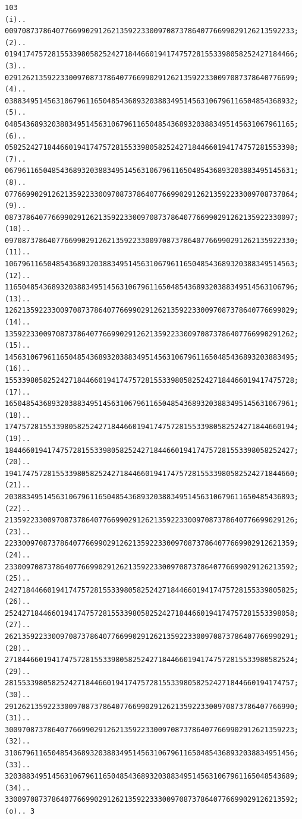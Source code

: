 \documentclass[10pt,a4paper]{article}
\begin{document}
\begin{verbatim}
103
(i).. 00970873786407766990291262135922330097087378640776699029126213592233;
(2).. 01941747572815533980582524271844660194174757281553398058252427184466;
(3).. 02912621359223300970873786407766990291262135922330097087378640776699;
(4).. 03883495145631067961165048543689320388349514563106796116504854368932;
(5).. 04854368932038834951456310679611650485436893203883495145631067961165;
(6).. 05825242718446601941747572815533980582524271844660194174757281553398;
(7).. 06796116504854368932038834951456310679611650485436893203883495145631;
(8).. 07766990291262135922330097087378640776699029126213592233009708737864;
(9).. 08737864077669902912621359223300970873786407766990291262135922330097;
(10).. 09708737864077669902912621359223300970873786407766990291262135922330;
(11).. 10679611650485436893203883495145631067961165048543689320388349514563;
(12).. 11650485436893203883495145631067961165048543689320388349514563106796;
(13).. 12621359223300970873786407766990291262135922330097087378640776699029;
(14).. 13592233009708737864077669902912621359223300970873786407766990291262;
(15).. 14563106796116504854368932038834951456310679611650485436893203883495;
(16).. 15533980582524271844660194174757281553398058252427184466019417475728;
(17).. 16504854368932038834951456310679611650485436893203883495145631067961;
(18).. 17475728155339805825242718446601941747572815533980582524271844660194;
(19).. 18446601941747572815533980582524271844660194174757281553398058252427;
(20).. 19417475728155339805825242718446601941747572815533980582524271844660;
(21).. 20388349514563106796116504854368932038834951456310679611650485436893;
(22).. 21359223300970873786407766990291262135922330097087378640776699029126;
(23).. 22330097087378640776699029126213592233009708737864077669902912621359;
(24).. 23300970873786407766990291262135922330097087378640776699029126213592;
(25).. 24271844660194174757281553398058252427184466019417475728155339805825;
(26).. 25242718446601941747572815533980582524271844660194174757281553398058;
(27).. 26213592233009708737864077669902912621359223300970873786407766990291;
(28).. 27184466019417475728155339805825242718446601941747572815533980582524;
(29).. 28155339805825242718446601941747572815533980582524271844660194174757;
(30).. 29126213592233009708737864077669902912621359223300970873786407766990;
(31).. 30097087378640776699029126213592233009708737864077669902912621359223;
(32).. 31067961165048543689320388349514563106796116504854368932038834951456;
(33).. 32038834951456310679611650485436893203883495145631067961165048543689;
(34).. 33009708737864077669902912621359223330097087378640776699029126213592;
(o).. 3
\end{verbatim}
\end{document}
